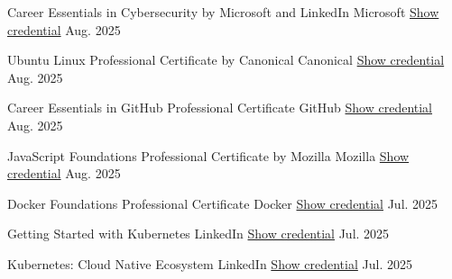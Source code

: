 \begin{cvhonors}
  \cvhonor
    {Career Essentials in Cybersecurity by Microsoft and LinkedIn} %
    {Microsoft} %
    {\href{https://www.linkedin.com/learning/certificates/7b5c2a9aa915ecb52e287a180efafa1cc9018ad81f76342aa3549759f6c636a3}{Show credential}} %
    {Aug. 2025} %

  \cvhonor
    {Ubuntu Linux Professional Certificate by Canonical} %
    {Canonical} %
    {\href{https://www.linkedin.com/learning/certificates/cfa4ba7e339b8a0554f714fbf6ac4eb9cd173060ff1cde9d0aa27c0b50cb39c8}{Show credential}} %
    {Aug. 2025} %

  \cvhonor
    {Career Essentials in GitHub Professional Certificate} %
    {GitHub} %
    {\href{https://www.linkedin.com/learning/certificates/01c7c769a96184b2e85914bb67151fa6bfc53d92beb0075ee878d5ca7eaebf00}{Show credential}} %
    {Aug. 2025} %

  \cvhonor
    {JavaScript Foundations Professional Certificate by Mozilla} %
    {Mozilla} %
    {\href{https://www.linkedin.com/learning/certificates/8775c529b98bc047e68cb6969bf8712a94e3c78be04a083ea0d56b8a3e53a00c}{Show credential}} %
    {Aug. 2025} %

  \cvhonor
    {Docker Foundations Professional Certificate} %
    {Docker} %
    {\href{https://www.linkedin.com/learning/certificates/c89ffd5bdee2602ef089f90a554de80e1578b09a198d3a8b4aed0e207144f5dd}{Show credential}} %
    {Jul. 2025} %

  \cvhonor
    {Getting Started with Kubernetes} %
    {LinkedIn} %
    {\href{https://www.linkedin.com/learning/certificates/bde4bb30a77eba768318a2e53a73ca6330e564c46d1f21381a6016944b6e7dc1}{Show credential}} %
    {Jul. 2025} %

  \cvhonor
    {Kubernetes: Cloud Native Ecosystem} %
    {LinkedIn} %
    {\href{https://www.linkedin.com/learning/certificates/bc678f1298df84090c58ba46857b988c6c2c0ffb9b1f36ee3e51bd8e33742674}{Show credential}} %
    {Jul. 2025} %


\end{cvhonors}
